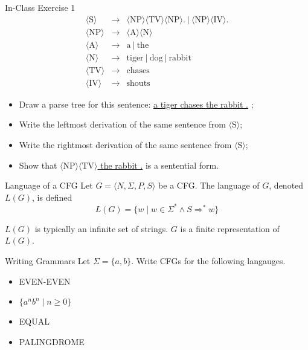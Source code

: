 \documentclass{beamer}
\newcommand{\nt}[1]{{\langle \mbox{#1}\rangle}}
\begin{document}
\begin{frame} {In-Class Exercise 1}
\[\begin{array}{rcl}
      \nt{S} &\rightarrow &  \nt{NP} \nt{TV} \nt{NP} .~|~ \nt{NP} \nt{IV} . \\
      \nt{NP}  &\rightarrow & \nt{A} \nt{N}\\
      \nt{A}   &\rightarrow & \textrm{a}~|~\textrm{the}\\
      \nt{N}   &\rightarrow & \textrm{tiger}~|~\textrm{dog}~|~\textrm{rabbit}\\
      \nt{TV}   &\rightarrow & \textrm{chases}\\
      \nt{IV}   &\rightarrow & \textrm{shouts}
\end{array}\]

\vfill

\begin{itemize}
\item  Draw a parse tree for this sentence: \underline{a tiger chases the rabbit .} ;
\item Write the leftmost derivation of the same sentence from $\nt{S}$;
\item Write the rightmost derivation of the same sentence from $\nt{S}$;
\item Show that \underline{$\nt{NP}\nt{TV}$ the rabbit .} is a sentential form.
\end{itemize}
\end{frame}



\begin{frame} {Language of a CFG}
Let $G=\langle N, \Sigma, P, S\rangle$ be a CFG. The language of $G$, denoted $L(G)$, is defined
\[
 L(G) = \{ w \mid w\in\Sigma^{*} \wedge S\Rightarrow^{*} w\}
\]
\hfill

$L(G)$ is typically an infinite set of strings. $G$ is a finite representation of $L(G)$.
\end{frame}

\begin{frame}{Writing Grammars} 
Let $\Sigma=\{a,b\}$. Write CFGs for the following langauges.
\begin{itemize}
  \item EVEN-EVEN
  \item $\{ a^nb^n\mid n\geq 0\}$
  \item EQUAL
  \item PALINGDROME
\end{itemize}
\end{frame}
\end{document}
